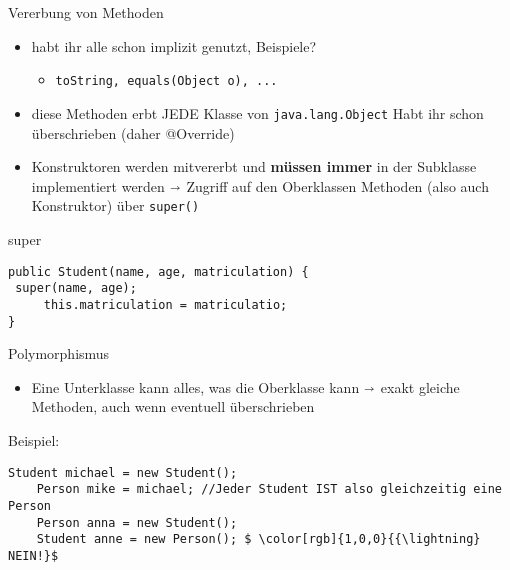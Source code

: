 \documentclass[18pt]{beamer}
\begin{document}
\begin{frame}[fragile]{Vererbung von Methoden}
\begin{itemize}
	\item habt ihr alle schon implizit genutzt, Beispiele? \pause
	\begin{itemize}
		\item \lstinline{toString, equals(Object o), ...} \pause
	\end{itemize}
	\item diese Methoden erbt JEDE Klasse von \lstinline{java.lang.Object} \pause \newline
	Habt ihr schon überschrieben (daher @Override) \pause
	\item Konstruktoren werden mitvererbt und \textbf{müssen immer} in der Subklasse implementiert werden \newline
	$\shortrightarrow$ Zugriff auf den Oberklassen Methoden (also auch Konstruktor) über \lstinline{super()} \pause
\end{itemize}
\begin{exampleblock}{super}
\begin{lstlisting}
public Student(name, age, matriculation) {
 super(name, age);
	 this.matriculation = matriculatio;
}
\end{lstlisting}
\end{exampleblock}
\end{frame}

\begin{frame}[fragile]{Polymorphismus}
\begin{itemize}
	\item Eine Unterklasse kann alles, was die Oberklasse kann \newline
	$\shortrightarrow$ exakt gleiche Methoden, auch wenn eventuell überschrieben \newline 
\end{itemize}
Beispiel: 
\begin{lstlisting}[mathescape]
	Student michael = new Student();
	Person mike = michael; //Jeder Student IST also gleichzeitig eine Person 
	Person anna = new Student();
	Student anne = new Person(); $ \color[rgb]{1,0,0}{{\lightning} NEIN!}$
\end{lstlisting}
\end{frame}
\end{document}
